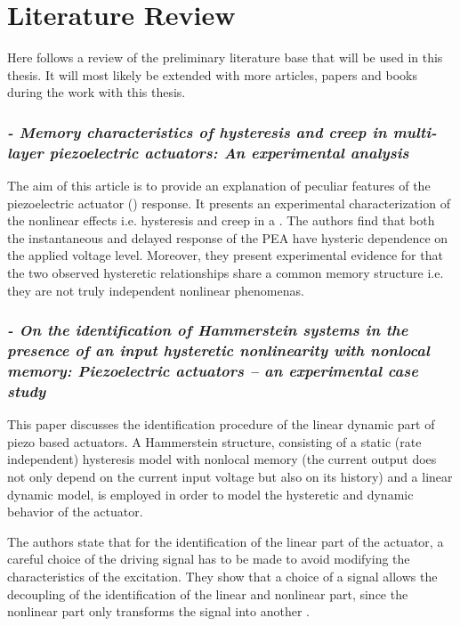 \chapter{Literature Review}\label{cha:litreview}

Here follows a review of the preliminary literature base that will be used in this thesis. It will most likely be extended with more articles, papers and books during the work with this thesis.

\subsection*{\citep*{Biggio:2014} {\small \emph{- Memory characteristics of hysteresis and creep in multi-layer piezoelectric actuators: An experimental analysis}}}
The aim of this article is to provide an explanation of peculiar features of the piezoelectric actuator (\abbrPEA) response. It presents an experimental characterization of the nonlinear effects i.e. hysteresis and creep in a \abbrPEA. The authors find that both the instantaneous and delayed response of the PEA have hysteric dependence on the applied voltage level.
Moreover, they present experimental evidence for that the two observed hysteretic relationships share a common memory structure i.e. they are not truly independent nonlinear phenomenas.

\subsection*{\citep*{ButcherIdentification:2015}{\small \emph{- On the identification of Hammerstein systems in the presence of an input hysteretic nonlinearity with nonlocal memory: Piezoelectric actuators – an experimental case study}}}
This paper discusses the identification procedure of the linear dynamic part of piezo based actuators. A Hammerstein structure, consisting of a static (rate independent) hysteresis model with nonlocal memory (the current output does not only depend on the current input voltage but also on its history) and a linear dynamic model, is employed in order to model the hysteretic and dynamic behavior of the actuator.

The authors state that for the identification of the linear part of the actuator, a careful choice of the driving signal has to be made to avoid modifying the characteristics of the excitation. They show that a choice of a \abbrPBRS signal allows the decoupling of the identification of the linear and nonlinear part, since the nonlinear part only transforms the \abbrPBRS signal into another \abbrPBRS.

